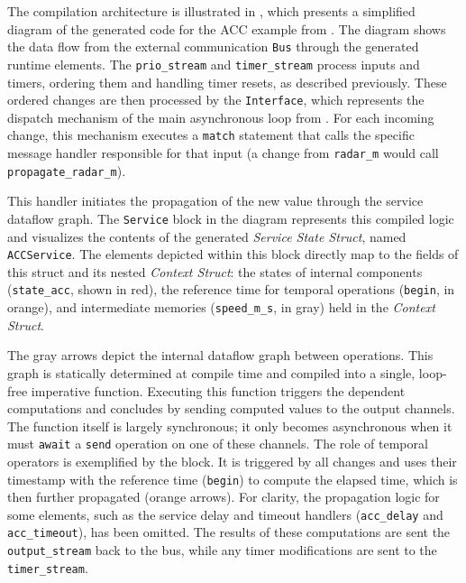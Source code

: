 The compilation architecture is illustrated in , which
presents a simplified diagram of the generated code for the ACC example from .
The diagram shows the data flow from the external communication \texttt{Bus} through the generated
runtime elements. The \texttt{prio\_stream} and \texttt{timer\_stream} process inputs and timers,
ordering them and handling timer resets, as described previously. These ordered changes are then
processed by the \texttt{Interface}, which represents the dispatch mechanism of the main
asynchronous loop from . For each incoming
change, this mechanism executes a \texttt{match} statement that calls the specific message handler
responsible for that input (\eg a change from \texttt{radar\_m} would call
\texttt{propagate\_radar\_m}).

This handler initiates the propagation of the new value through the service dataflow graph.
The \texttt{Service} block in the diagram represents this compiled logic and visualizes the
contents of the generated \emph{Service State Struct}, named \texttt{ACCService}. The
elements depicted within this block directly map to the fields of this struct and its nested
\emph{Context Struct}: the states of internal components (\eg \texttt{state\_acc}, shown
in red), the reference time for temporal operations (\texttt{begin}, in orange), and
intermediate memories (\eg \texttt{speed\_m\_s}, in gray) held in the \emph{Context Struct}.

The gray arrows depict the internal dataflow graph between operations. This graph is statically
determined at compile time and compiled into a single, loop-free imperative function. Executing this
function triggers the dependent computations and concludes by sending computed values to the output
channels. The function itself is largely synchronous; it only becomes asynchronous when it must
\texttt{await} a \texttt{send} operation on one of these channels. The role of temporal operators is
exemplified by the  block. It is triggered by all changes and uses their timestamp with
the reference time (\texttt{begin}) to compute the elapsed time, which is then further propagated
(orange arrows). For clarity, the propagation logic for some elements, such as the service delay and
timeout handlers (\texttt{acc\_delay} and \texttt{acc\_timeout}), has been omitted. The results of
these computations are sent \via the \texttt{output\_stream} back to the bus, while any timer
modifications are sent to the \texttt{timer\_stream}.

